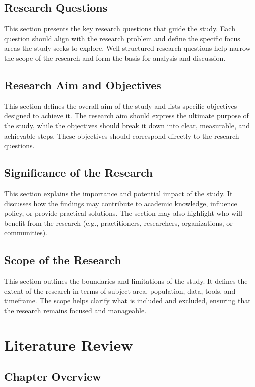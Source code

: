\documentclass[12pt,a4paper]{report}
\begin{document}
\section{Research Questions}
This section presents the key research questions that guide the study. 
Each question should align with the research problem and define the specific focus areas the study seeks to explore. 
Well-structured research questions help narrow the scope of the research and form the basis for analysis and discussion.

\section{Research Aim and Objectives}
This section defines the overall aim of the study and lists specific objectives designed to achieve it. 
The research aim should express the ultimate purpose of the study, while the objectives should break it down into clear, measurable, and achievable steps. 
These objectives should correspond directly to the research questions.

\section{Significance of the Research}
This section explains the importance and potential impact of the study. 
It discusses how the findings may contribute to academic knowledge, influence policy, or provide practical solutions. 
The section may also highlight who will benefit from the research (e.g., practitioners, researchers, organizations, or communities).

\section{Scope of the Research}
This section outlines the boundaries and limitations of the study. 
It defines the extent of the research in terms of subject area, population, data, tools, and timeframe. 
The scope helps clarify what is included and excluded, ensuring that the research remains focused and manageable.


\chapter{Literature Review}

\section{Chapter Overview}
\end{document}
